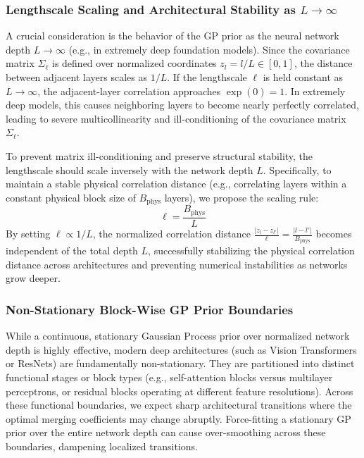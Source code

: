 \subsubsection{Lengthscale Scaling and Architectural Stability as $L \to \infty$}
\label{subsec:lengthscale_scaling}

A crucial consideration is the behavior of the GP prior as the neural network
depth $L \to \infty$ (e.g., in extremely deep foundation models). Since the
covariance matrix $\Sigma_{\ell}$ is defined over normalized coordinates $z_l =
l/L \in [0, 1]$, the distance between adjacent layers scales as $1/L$. If the
lengthscale $\ell$ is held constant as $L \to \infty$, the adjacent-layer
correlation approaches $\exp(0) = 1$. In extremely deep models, this causes
neighboring layers to become nearly perfectly correlated, leading to severe
multicollinearity and ill-conditioning of the covariance matrix $\Sigma_{\ell}$.

To prevent matrix ill-conditioning and preserve structural stability, the
lengthscale should scale inversely with the network depth $L$. Specifically, to
maintain a stable physical correlation distance (e.g., correlating layers within
a constant physical block size of $B_{\text{phys}}$ layers), we propose the
scaling rule:
\begin{equation}
\ell = \frac{B_{\text{phys}}}{L}
\label{eq:lengthscale_scaling}
\end{equation}
By setting $\ell \propto 1/L$, the normalized correlation distance $\frac{\lvert
z_l - z_{l'} \rvert}{\ell} = \frac{\lvert l - l' \rvert}{B_{\text{phys}}}$
becomes independent of the total depth $L$, successfully stabilizing the
physical correlation distance across architectures and preventing numerical
instabilities as networks grow deeper.

\subsubsection{Non-Stationary Block-Wise GP Prior Boundaries}
\label{subsubsec:block_wise_gp}

While a continuous, stationary Gaussian Process prior over normalized network
depth is highly effective, modern deep architectures (such as Vision
Transformers or ResNets) are fundamentally non-stationary. They are partitioned
into distinct functional stages or block types (e.g., self-attention blocks
versus multilayer perceptrons, or residual blocks operating at different feature
resolutions). Across these functional boundaries, we expect sharp architectural
transitions where the optimal merging coefficients may change abruptly. Force-fitting
a stationary GP prior over the entire network depth can cause over-smoothing
across these boundaries, dampening localized transitions.

